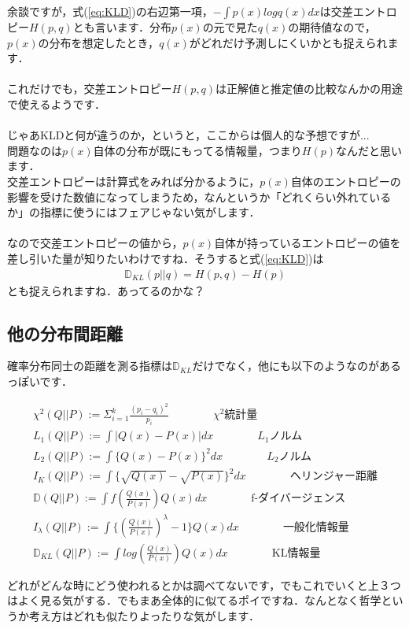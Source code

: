 \documentclass[11pt,a4paper,uplatex]{ujreport}
\begin{document}
余談ですが，式(\ref{eq:KLD})の右辺第一項，$- \int p(x) log q(x)dx$は交差エントロピー$H(p,q)$とも言います．分布$p(x)$の元で見た$q(x)$の期待値なので，$p(x)$の分布を想定したとき，$q(x)$がどれだけ予測しにくいかとも捉えられます．\\
\\

これだけでも，交差エントロピー$H(p,q)$は正解値と推定値の比較なんかの用途で使えるようです．\\
\\

じゃあKLDと何が違うのか，というと，ここからは個人的な予想ですが...\\

問題なのは$p(x)$自体の分布が既にもってる情報量，つまり$H(p)$なんだと思います．\\

交差エントロピーは計算式をみれば分かるように，$p(x)$自体のエントロピーの影響を受けた数値になってしまうため，なんというか「どれくらい外れているか」の指標に使うにはフェアじゃない気がします．\\
\\

なので交差エントロピーの値から，$p(x)$自体が持っているエントロピーの値を差し引いた量が知りたいわけですね．そうすると式(\ref{eq:KLD})は
\begin{eqnarray}
\mathbb{D}_{KL}(p||q) = H(p,q) - H(p)
\end{eqnarray}
とも捉えられますね．あってるのかな？

\subsection{他の分布間距離}
確率分布同士の距離を測る指標は$\mathbb{D}_{KL}$だけでなく，他にも以下のようなのがあるっぽいです\cite{dist}．
\begin{screen}
\begin{eqnarray}
\chi^2(Q||P) := \Sigma_{i=1}^k \frac{(p_i - q_i)^2}{p_i} \qquad \qquad  \text{$\chi^2$統計量}\\
L_1(Q||P) := \int |Q(x) - P(x)|dx   \qquad \qquad  \text{$L_1$ノルム} \\
L_2(Q||P) := \int\{ Q(x) - P(x)\}^2 dx   \qquad \qquad  \text{$L_2$ノルム}\\
I_K(Q||P) := \int \{ \sqrt{Q(x)} - \sqrt{P(x)} \}^2 dx    \qquad \qquad  \text{ヘリンジャー距離}\\
\mathbb{D}(Q||P) := \int f(\frac{Q(x)}{P(x)}) Q(x)dx   \qquad \qquad  \text{f-ダイバージェンス}\\
I_\lambda(Q||P) := \int \{ (\frac{Q(x)}{P(x)})^{\lambda} -1 \}Q(x) dx   \qquad \qquad  \text{一般化情報量}\\
\mathbb{D}_{KL}(Q||P) := \int log(\frac{Q(x)}{P(x)})Q(x) dx   \qquad \qquad  \text{KL情報量}
\end{eqnarray}
\end{screen}
どれがどんな時にどう使われるとかは調べてないです，でもこれでいくと上３つはよく見る気がする．でもまあ全体的に似てるポイですね．なんとなく哲学というか考え方はどれも似たりよったりな気がします．
\end{document}
